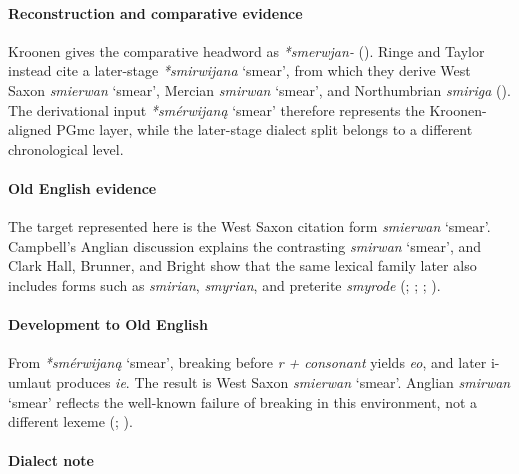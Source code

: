 \documentclass[
  british,
  a4paper,
]{article}
\providecommand{\Recon}[1]{\emph{*#1}}
\begin{document}
\paragraph{Reconstruction and comparative
evidence}\label{reconstruction-and-comparative-evidence-54}

Kroonen gives the comparative headword as \emph{*smerwjan-}
(). Ringe and Taylor instead
cite a later-stage \Recon{smirwijana} `smear', from which they derive
West Saxon {\emph{smierwan}} `smear', Mercian {\emph{smirwan}} `smear',
and Northumbrian \emph{smiriga} (). The derivational input \Recon{smérwijaną} `smear'
therefore represents the Kroonen-aligned PGmc layer, while the
later-stage dialect split belongs to a different chronological level.

\paragraph{Old English evidence}\label{old-english-evidence-56}

The target represented here is the West Saxon citation form
{\emph{smierwan}} `smear'. Campbell's Anglian discussion explains the
contrasting {\emph{smirwan}} `smear', and Clark Hall, Brunner, and
Bright show that the same lexical family later also includes forms such
as \emph{smirian}, \emph{smyrian}, and preterite \emph{smyrode}
(;
;
;
).

\paragraph{Development to Old
English}\label{development-to-old-english-55}

From \Recon{smérwijaną} `smear', breaking before \emph{r + consonant}
yields \emph{eo}, and later i-umlaut produces \emph{ie}. The result is
West Saxon {\emph{smierwan}} `smear'. Anglian {\emph{smirwan}} `smear'
reflects the well-known failure of breaking in this environment, not a
different lexeme (;
).

\paragraph{Dialect note}\label{dialect-note-5}
\end{document}
